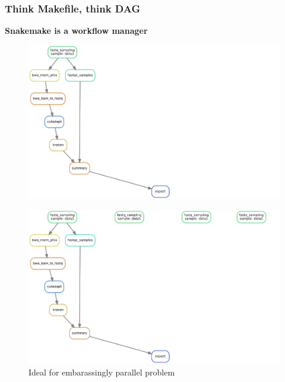 \documentclass{beamer}
\begin{document}
\begin{frame}
\frametitle{Think Makefile, think DAG}
    
   \centering \textbf{Snakemake is a workflow manager}\\
      
        {
            \begin{figure}
                \includegraphics[width=\textwidth,height=0.6\textheight]{images/dag_0.png}
                \caption[1]{}
            \end{figure}                
        }
        {
            \begin{figure}
                \includegraphics[width=\textwidth,height=0.6\textheight]{images/dag_1.png}
                \caption[1]{Ideal for embarassingly parallel problem}
            \end{figure}                
        } 
        {
            \begin{figure}

\end{figure}}
\end{frame}
\end{document}
